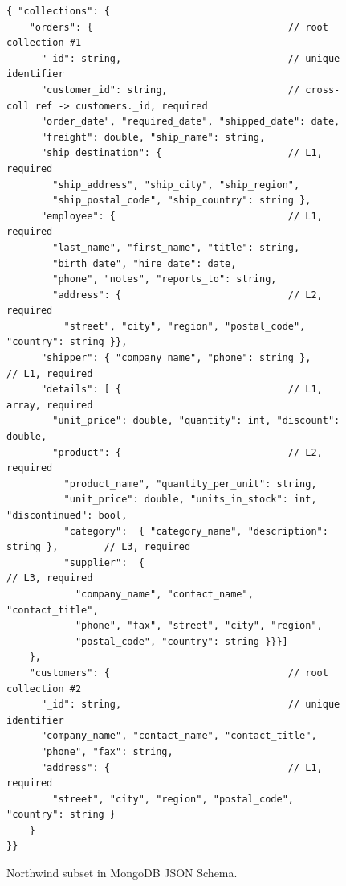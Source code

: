   \begin{figure}[htbp]
  \centering
  \begin{minipage}{0.95\textwidth}
  \begin{lstlisting}[basicstyle=\ttfamily\scriptsize,
                     backgroundcolor=\color{green!4},
                     frame=single, framesep=3pt,
                     xleftmargin=4pt, basewidth=0.5em,
                     keepspaces=true]
{ "collections": {
    "orders": {                                  // root collection #1
      "_id": string,                             // unique identifier
      "customer_id": string,                     // cross-coll ref -> customers._id, required
      "order_date", "required_date", "shipped_date": date,
      "freight": double, "ship_name": string,
      "ship_destination": {                      // L1, required
        "ship_address", "ship_city", "ship_region",
        "ship_postal_code", "ship_country": string },
      "employee": {                              // L1, required
        "last_name", "first_name", "title": string,
        "birth_date", "hire_date": date,
        "phone", "notes", "reports_to": string,
        "address": {                             // L2, required
          "street", "city", "region", "postal_code", "country": string }},
      "shipper": { "company_name", "phone": string },          // L1, required
      "details": [ {                             // L1, array, required
        "unit_price": double, "quantity": int, "discount": double,
        "product": {                             // L2, required
          "product_name", "quantity_per_unit": string,
          "unit_price": double, "units_in_stock": int, "discontinued": bool,
          "category":  { "category_name", "description": string },        // L3, required
          "supplier":  {                                                  // L3, required
            "company_name", "contact_name", "contact_title",
            "phone", "fax", "street", "city", "region",
            "postal_code", "country": string }}}]
    },
    "customers": {                               // root collection #2
      "_id": string,                             // unique identifier
      "company_name", "contact_name", "contact_title",
      "phone", "fax": string,
      "address": {                               // L1, required
        "street", "city", "region", "postal_code", "country": string }
    }
}}
  \end{lstlisting}
  \end{minipage}
  \caption{Northwind subset in MongoDB JSON Schema.}
  \label{fig:nw-mongo}
  \end{figure}

